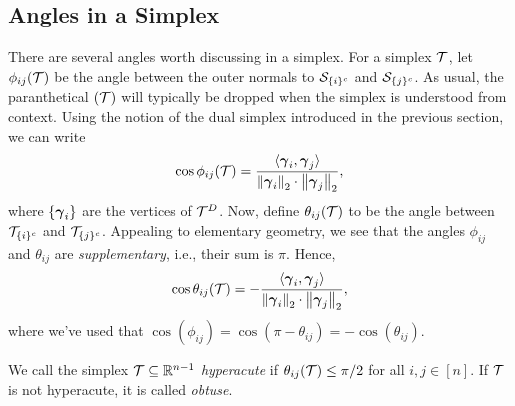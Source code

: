 \subsection{Angles in a Simplex}
There are several angles worth discussing in a simplex. For a simplex $\mathcal{T}$, let $\phi_{ij}(\mathcal{T})$ be the angle between the outer normals to $\mathcal{S}_{\{i\}^c}$ and $\mathcal{S}_{\{j\}^c}$. As usual, the paranthetical $(\mathcal{T})$ will typically be dropped when the simplex is understood from context. Using the notion of the dual simplex introduced in the previous section, we can write 
\begin{equation*}
\cos \phi_{ij}(\mathcal{T}) = \frac{\langle \vb*{\gamma}_i,\vb*{\gamma}_j\rangle }{\norm{\vb*{\gamma}_i}_2 \cdot \norm{\vb*{\gamma}_j}_2},
\end{equation*}
where $\{\vb*{\gamma}_i\}$ are the vertices of $\mathcal{T}^D$. 
Now, define $\theta_{ij}(\mathcal{T})$ to be the angle between $\mathcal{T}_{\{i\}^c}$ and $\mathcal{T}_{\{j\}^c}$. Appealing to elementary geometry, we see that the angles $\phi_{ij}$ and $\theta_{ij}$ are \emph{supplementary}, i.e., their sum is $\pi$. Hence, 
\begin{equation}
\label{eq:cos_theta_ij}
\cos \theta_{ij}(\mathcal{T}) = - \frac{\langle \vb*{\gamma}_i,\vb*{\gamma}_j\rangle }{\norm{\vb*{\gamma}_i}_2 \cdot \norm{\vb*{\gamma}_j}_2},
\end{equation}
where we've used that $\cos(\phi_{ij}) = \cos(\pi - \theta_{ij}) = -\cos(\theta_{ij})$. 

\begin{definition}
	\label{def:hyperacute}
	We call the simplex $\mathcal{T}\subseteq \mathbb{R}^{n-1}$ \emph{hyperacute} if $\theta_{ij}(\mathcal{T})\leq \pi/2$ for all $i,j\in[n]$. If $\mathcal{T}$ is not hyperacute, it is called \emph{obtuse}. 
\end{definition}


